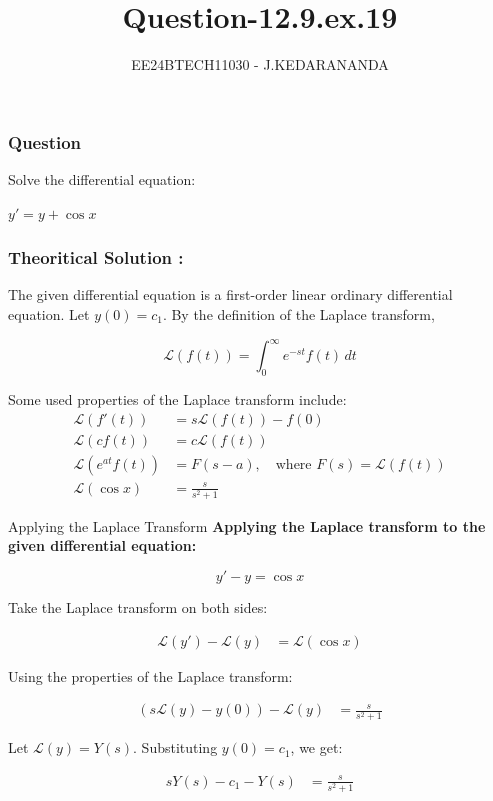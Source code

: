 \documentclass{beamer}
\title{Question-12.9.ex.19}
\author{EE24BTECH11030 - J.KEDARANANDA}
\date{}
\begin{document}
	
	\frame{\titlepage}
	
	\begin{frame}
		\frametitle{Question}
		Solve the differential equation:
		
		$y' = y + \cos x$
	\end{frame}
	
	\begin{frame}
		\frametitle{Theoritical Solution : }
		
		\centering
		The given differential equation is a first-order linear ordinary differential equation. Let $y(0) = c_1$. By the definition of the Laplace transform,
		
		\[
		\mathcal{L}(f(t)) = \int_0^\infty e^{-st} f(t) \, dt
		\]
		
		Some used properties of the Laplace transform include:
		\begin{align}
			\mathcal{L}(f'(t)) &= s\mathcal{L}(f(t)) - f(0) \\
			\mathcal{L}(cf(t)) &= c\mathcal{L}(f(t)) \\
			\mathcal{L}(e^{at}f(t)) &= F(s - a), \quad \text{where } F(s) = \mathcal{L}(f(t)) \\
			\mathcal{L}(\cos x) &= \frac{s}{s^2 + 1}
		\end{align}
	\end{frame}
	\begin{frame}{Applying the Laplace Transform}
		\textbf{Applying the Laplace transform to the given differential equation:}
		
		\[
		y' - y = \cos x
		\]
		
		Take the Laplace transform on both sides:
		
		\begin{align}
			\mathcal{L}(y') - \mathcal{L}(y) &= \mathcal{L}(\cos x)
		\end{align}
		
		Using the properties of the Laplace transform:
		
		\begin{align}
			(s\mathcal{L}(y) - y(0)) - \mathcal{L}(y) &= \frac{s}{s^2 + 1}
		\end{align}
		
		Let $\mathcal{L}(y) = Y(s)$. Substituting $y(0) = c_1$, we get:
		
		\begin{align}
			sY(s) - c_1 - Y(s) &= \frac{s}{s^2 + 1}
		\end{align}
	\end{frame}
\end{document}
